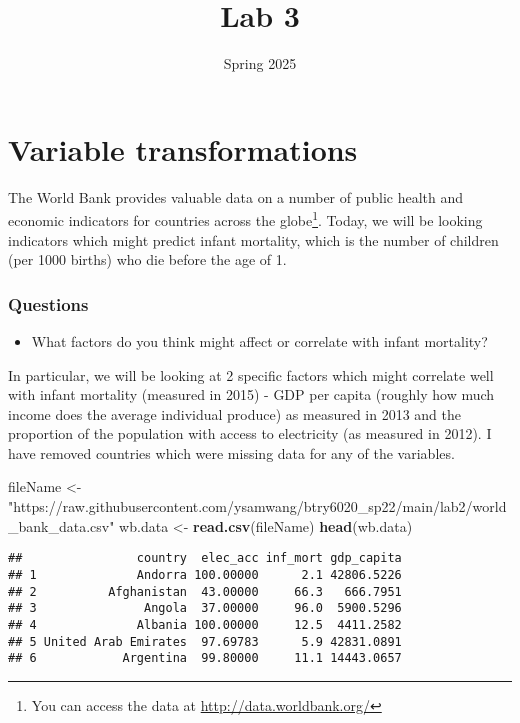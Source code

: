 \documentclass[
]{article}
\title{Lab 3}
\author{}
\date{\vspace{-2.5em}Spring 2025}
\newenvironment{Shaded}{\begin{snugshade}}{\end{snugshade}}
\newcommand{\FunctionTok}[1]{\textcolor[rgb]{0.13,0.29,0.53}{\textbf{#1}}}
\newcommand{\NormalTok}[1]{#1}
\newcommand{\OtherTok}[1]{\textcolor[rgb]{0.56,0.35,0.01}{#1}}
\newcommand{\StringTok}[1]{\textcolor[rgb]{0.31,0.60,0.02}{#1}}
\providecommand{\tightlist}{%
  \setlength{\itemsep}{0pt}\setlength{\parskip}{0pt}}
\begin{document}
\maketitle

\section{Variable transformations}\label{variable-transformations}

The World Bank provides valuable data on a number of public health and
economic indicators for countries across the globe\footnote{You can
  access the data at \url{http://data.worldbank.org/}}. Today, we will
be looking indicators which might predict infant mortality, which is the
number of children (per 1000 births) who die before the age of 1.

\subsubsection{Questions}\label{questions}

\begin{itemize}
\tightlist
\item
  What factors do you think might affect or correlate with infant
  mortality?
\end{itemize}

In particular, we will be looking at 2 specific factors which might
correlate well with infant mortality (measured in 2015) - GDP per capita
(roughly how much income does the average individual produce) as
measured in 2013 and the proportion of the population with access to
electricity (as measured in 2012). I have removed countries which were
missing data for any of the variables.

\begin{Shaded}
\begin{Highlighting}[]
\NormalTok{fileName }\OtherTok{\textless{}{-}} \StringTok{"https://raw.githubusercontent.com/ysamwang/btry6020\_sp22/main/lab2/world\_bank\_data.csv"}
\NormalTok{wb.data }\OtherTok{\textless{}{-}} \FunctionTok{read.csv}\NormalTok{(fileName)}
\FunctionTok{head}\NormalTok{(wb.data)}
\end{Highlighting}
\end{Shaded}

\begin{verbatim}
##                country  elec_acc inf_mort gdp_capita
## 1              Andorra 100.00000      2.1 42806.5226
## 2          Afghanistan  43.00000     66.3   666.7951
## 3               Angola  37.00000     96.0  5900.5296
## 4              Albania 100.00000     12.5  4411.2582
## 5 United Arab Emirates  97.69783      5.9 42831.0891
## 6            Argentina  99.80000     11.1 14443.0657
\end{verbatim}
\end{document}
